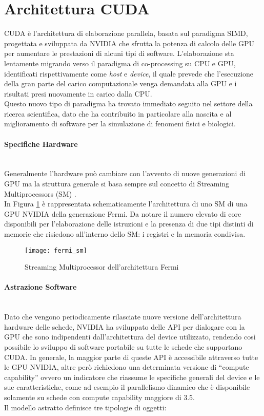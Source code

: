 \section{Architettura CUDA}

CUDA è l'architettura di elaborazione
parallela, basata sul paradigma SIMD,
progettata e sviluppata da NVIDIA che sfrutta la potenza di calcolo delle GPU
per aumentare le prestazioni di alcuni tipi di software.
L'elaborazione sta lentamente migrando verso il paradigma di 
co-processing su CPU e GPU, identificati rispettivamente come
\textit{host} e \textit{device}, il quale prevede che l'esecuzione della
gran parte del carico computazionale venga demandata alla GPU e i risultati
presi nuovamente in carico dalla CPU.
\\
Questo nuovo tipo di paradigma ha trovato immediato seguito nel settore
della ricerca scientifica, dato che ha contribuito in particolare alla nascita
e al miglioramento di software per la simulazione di fenomeni fisici e
biologici.

\paragraph{Specifiche Hardware}\mbox{}
\\
Generalmente l'hardware può cambiare con l'avvento di
nuove generazioni di GPU ma la struttura generale si basa sempre sul concetto di
Streaming Multiprocessors (SM) \cite{nickolls2010gpu}.
\\
In Figura \ref{fig:fermi-arch} è rappresentata schematicamente l'architettura
di uno SM di una GPU NVIDIA della generazione Fermi. Da notare il
numero elevato di core disponibili per l'elaborazione delle istruzioni e la
presenza di due tipi distinti di memorie che risiedono all'interno dello SM:
i registri e la memoria condivisa.

\begin{figure}[t]
    \centering
    \texttt{[image: fermi\_sm]}
    \caption{Streaming Multiprocessor dell'architettura Fermi 
        \cite{nickolls2010gpu}}
    \label{fig:fermi-arch}
\end{figure}

\paragraph{Astrazione Software}\mbox{}
\\
Dato che vengono periodicamente rilasciate nuove versione dell'architettura
hardware delle schede, NVIDIA ha sviluppato delle API per dialogare con la GPU
che sono indipendenti dall'architettura del device utilizzato, rendendo
così possibile lo sviluppo di software portabile su tutte le schede che
supportano CUDA. In generale, la maggior parte di queste API è accessibile
attraverso tutte le GPU NVIDIA, altre però richiedono una determinata versione
di ``compute capability'' ovvero un indicatore che riassume le specifiche
generali del device e le sue caratteristiche, come ad esempio il parallelismo
dinamico che è disponibile solamente su schede con compute capability maggiore
di 3.5.
\\
Il modello astratto definisce tre tipologie di oggetti:

